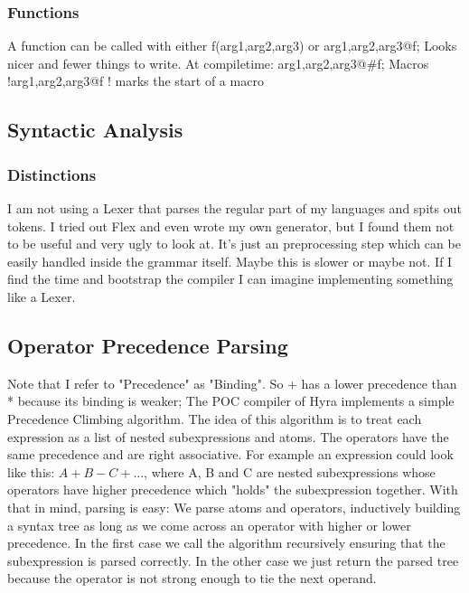 \documentclass[]{article}
\begin{document}
\subsubsection{Functions}
A function can be called with either f(arg1,arg2,arg3) or arg1,arg2,arg3@f; Looks nicer and fewer things to write.
At compiletime: arg1,arg2,arg3@\#f;
Macros !arg1,arg2,arg3@f ! marks the start of a macro


\subsection{Syntactic Analysis}
\subsubsection{Distinctions}
I am not using a Lexer that parses the regular part of my languages and spits out tokens. I tried out Flex and even wrote my own generator, but I found them not to be useful and very ugly to look at. It's just an preprocessing step which can be easily handled inside the grammar itself. Maybe this is slower or maybe not. If I find the time and bootstrap the compiler I can imagine implementing something like a Lexer.

\subsection{Operator Precedence Parsing}
Note that I refer to "Precedence" as "Binding". So + has a lower precedence than * because its binding is weaker;
The POC compiler of Hyra implements a simple Precedence Climbing algorithm. The idea of this algorithm is to treat each expression as a list of nested subexpressions and atoms. The operators have the same precedence and are right associative. For example an expression could look like this: $ A + B - C + ...$, where A, B and C are nested subexpressions whose operators have higher precedence which "holds" the subexpression together. With that in mind, parsing is easy: We parse atoms and operators, inductively building a syntax tree as long as we come across an operator with higher or lower precedence. In the first case we call the algorithm recursively ensuring that the subexpression is parsed correctly. In the other case we just return the parsed tree because the operator is not strong enough to tie the next operand. 
   
\end{document}
